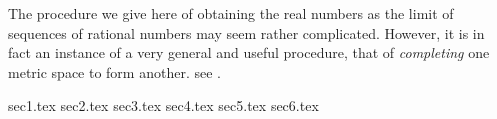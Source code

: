 \begin{note}
  The procedure we give here of obtaining the real numbers as the limit of sequences of rational numbers may seem rather complicated.
  However, it is in fact an instance of a very general and useful procedure, that of \emph{completing} one metric space to form another.
  see .
\end{note}

{sec1.tex}
{sec2.tex}
{sec3.tex}
{sec4.tex}
{sec5.tex}
{sec6.tex}
